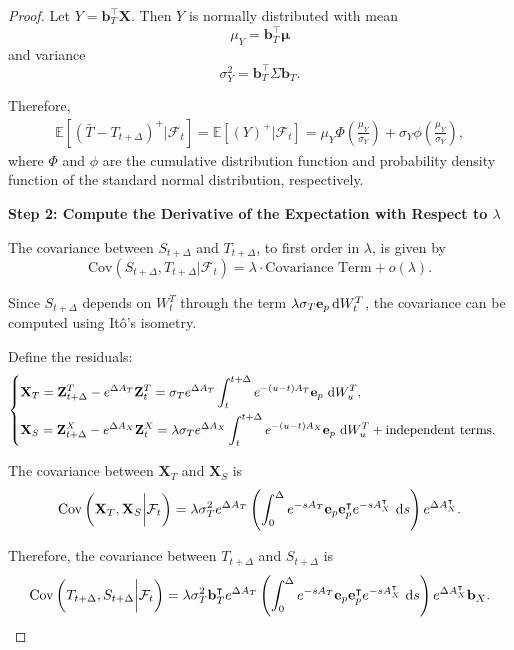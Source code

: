 \documentclass[10pt,a4paper,reqno]{amsart}
\theoremstyle{example}
\newcommand{\Cov}{\mathrm{Cov}}
\newcommand*\D{\mathop{}\!\textnormal{d}}
\begin{document}
\begin{proof}
Let $Y = \mathbf{b}_T^\intercal \mathbf{X}$. Then $Y$ is normally distributed with mean
\[
\mu_Y = \mathbf{b}_T^\intercal \boldsymbol{\mu}
\]
and variance
\[
\sigma_Y^2 = \mathbf{b}_T^\intercal \Sigma \mathbf{b}_T.
\]

Therefore,
\begin{align}
    \mathbb{E}\left[ (\bar{T} - T_{t+\Delta})^+ \bigg| \mathcal{F}_t \right] = \mathbb{E}\left[ (Y)^+ \bigg| \mathcal{F}_t \right] = \mu_Y \Phi\left( \frac{\mu_Y}{\sigma_Y} \right) + \sigma_Y \phi\left( \frac{\mu_Y}{\sigma_Y} \right),
\end{align}
where $\Phi$ and $\phi$ are the cumulative distribution function and probability density function of the standard normal distribution, respectively.

\textbf{Step 2: Compute the Derivative of the Expectation with Respect to $\lambda$}

The covariance between $S_{t+\Delta}$ and $T_{t+\Delta}$, to first order in $\lambda$, is given by
\[
\Cov\left( S_{t+\Delta}, T_{t+\Delta} \bigg| \mathcal{F}_t \right) = \lambda \cdot \text{Covariance Term} + o(\lambda).
\]

Since $S_{t+\Delta}$ depends on $W_t^T$ through the term $\lambda \sigma_T \mathbf{e}_p \D W_t^T$, the covariance can be computed using Itô's isometry.

Define the residuals:
\[
\begin{cases}
\displaystyle \mathbf{X}_T = \mathbf{Z}_{t+\Delta}^T - e^{\Delta A_T} \mathbf{Z}_t^T = \sigma_T e^{\Delta A_T} \int_t^{t+\Delta} e^{-(u - t) A_T} \mathbf{e}_p \, \D W_u^T, \\[2ex]
\displaystyle \mathbf{X}_S = \mathbf{Z}_{t+\Delta}^X - e^{\Delta A_X} \mathbf{Z}_t^X = \lambda \sigma_T e^{\Delta A_X} \int_t^{t+\Delta} e^{-(u - t) A_X} \mathbf{e}_p \, \D W_u^T + \text{independent terms}.
\end{cases}
\]

The covariance between $\mathbf{X}_T$ and $\mathbf{X}_S$ is
\[
\Cov\left( \mathbf{X}_T, \mathbf{X}_S \bigg| \mathcal{F}_t \right) = \lambda \sigma_T^2 e^{\Delta A_T} \left( \int_0^\Delta e^{-s A_T} \mathbf{e}_p \mathbf{e}_p^\intercal e^{-s A_X^\intercal} \, \D s \right) e^{\Delta A_X^\intercal}.
\]

Therefore, the covariance between $T_{t+\Delta}$ and $S_{t+\Delta}$ is
\[
\Cov\left( T_{t+\Delta}, S_{t+\Delta} \bigg| \mathcal{F}_t \right) = \lambda \sigma_T^2 \mathbf{b}_T^\intercal e^{\Delta A_T} \left( \int_0^\Delta e^{-s A_T} \mathbf{e}_p \mathbf{e}_p^\intercal e^{-s A_X^\intercal} \, \D s \right) e^{\Delta A_X^\intercal} \mathbf{b}_X.
\]


\end{proof}
\end{document}
